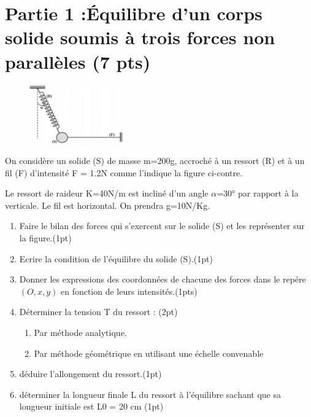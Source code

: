 \documentclass[12pt]{article}
\begin{document}
 \section*{Partie 1 :Équilibre d’un corps solide soumis à trois forces non parallèles (7 pts)}

\begin{figure}
    \vspace{-1.8cm}
    \includegraphics[width=0.36\textwidth]{./img/pendule_simple.png}
\end{figure}

On considère un solide (S) de masse
m=200g, accroché à un ressort (R) et à un fil (F) d'intensité F = 1.2N comme l’indique la figure ci-contre.

Le ressort de raideur K=40N/m est
incliné d’un angle $\alpha$=30° par rapport à la
verticale. Le fil est horizontal. On prendra g=10N/Kg.

\begin{enumerate}
    \item Faire le bilan des forces qui
s’exercent sur le solide (S) et les
        représenter sur la figure.\dotfill(1pt)

    \item Ecrire la condition de l’équilibre du solide (S).\dotfill(1pt)
    \item Donner les expressions des coordonnées de chacune des forces dans le repére $(O, x, y)$ en fonction de leurs intensités.\dotfill(1pts)
    \item Déterminer la tension T du ressort : \dotfill(2pt)
        \begin{enumerate}
            \item Par méthode analytique.
            \item Par méthode géométrique en utilisant une échelle convenable
        \end{enumerate}
    \item déduire l’allongement du ressort.\dotfill(1pt)
    \item déterminer la longueur finale L du ressort à l’équilibre sachant que sa longueur initiale est L0 = 20 cm \dotfill(1pt)
\end{enumerate}
\end{document}
